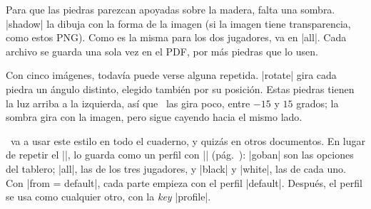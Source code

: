 \begin{goban}
Para que las piedras parezcan apoyadas sobre la madera, falta una sombra. |shadow| la dibuja con la forma de la imagen (si la imagen tiene transparencia, como estos PNG). Como es la misma para los dos jugadores, va en |all|. Cada archivo se guarda una sola vez en el PDF, por más piedras que lo usen.

\begin{codeexample}[width=4.8cm]

	\begin{goban}[label = {at = {north, west}}]
	\end{goban}
\end{codeexample}

Con cinco imágenes, todavía puede verse alguna repetida. |rotate| gira cada piedra un ángulo distinto, elegido también por su posición. Estas piedras tienen la luz arriba a la izquierda, así que \karu\ las gira poco, entre $-15$ y $15$ grados; la sombra gira con la imagen, pero sigue cayendo hacia el mismo lado.

\begin{codeexample}[width=4.8cm]

	\begin{goban}[label = {at = {north, west}}]
	\end{goban}
\end{codeexample}

\karu\ va a usar este estilo en todo el cuaderno, y quizás en otros documentos. En lugar de repetir el |\pgfgoset|, lo guarda como un perfil con |\pgfgodefineprofile| (pág.~\pageref{subsec:perfiles}): |goban| son las opciones del tablero; |all|, las de los tres jugadores, y |black| y |white|, las de cada uno. Con |from = default|, cada parte empieza con el perfil |default|. Después, el perfil se usa como cualquier otro, con la \emph{key} |profile|.


\end{goban}
